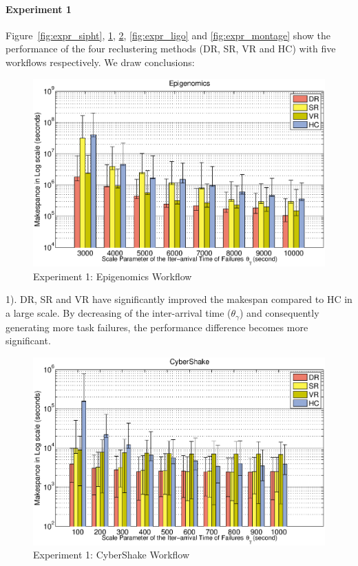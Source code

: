 \documentclass{IOS-Book-Article}
\begin{document}
\paragraph{\textbf{Experiment 1}}
Figure~\ref{fig:expr_sipht}, \ref{fig:expr_genome}, \ref{fig:expr_cybershake}, \ref{fig:expr_ligo} and \ref{fig:expr_montage} show the performance of the four reclustering methods (DR, SR, VR and HC) with five workflows respectively. We draw conclusions: 

\begin{figure}[!htb]
\centering
  \includegraphics[width=1.0\linewidth]{genome.eps}
  \caption{Experiment 1: Epigenomics Workflow}
  \label{fig:expr_genome}
\end{figure}


1). DR, SR and VR have significantly improved the makespan compared to HC in a large scale. By decreasing of the inter-arrival time ($\theta_{\gamma}$) and consequently generating more task failures, the performance difference becomes more significant. 


\begin{figure}[!htb]
\centering
  \includegraphics[width=1.0\linewidth]{cybershake.eps}
  \caption{Experiment 1: CyberShake Workflow}
  \label{fig:expr_cybershake}
\end{figure}
\end{document}
